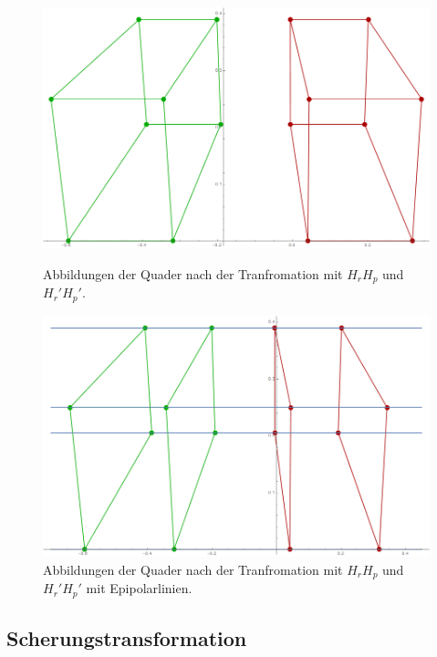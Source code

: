 \begin{figure}[!htb]
	\includegraphics[width=\linewidth]{images/Rectification_HrHp_same_Solutions.png}
	\caption[Transformation $H_rH_p$ und $H_r'H_p'$ ]{Abbildungen der Quader nach der Tranfromation mit $H_rH_p$ und $H_r'H_p'$.}
	\label{fig:RectSameHrHp1}
	\endminipage\hfill
	\includegraphics[width=\linewidth]{images/Rectification_HrHp_same_Solutions_Lines.png}
	\caption[Transformation $H_rH_p$ und $H_r'H_p'$ mit Epipolarlinien]{Abbildungen der Quader nach der Tranfromation mit $H_rH_p$ und $H_r'H_p'$ mit Epipolarlinien.}
	\label{fig:RectSameHrHp2}
	\endminipage\hfill
\end{figure}


\subsection{Scherungstransformation}

